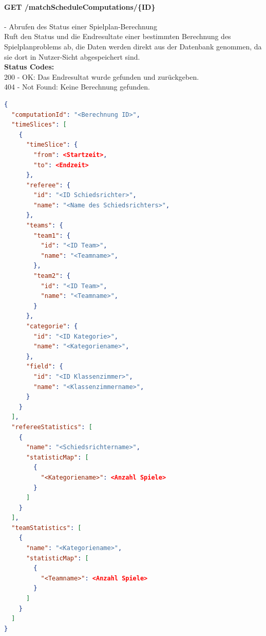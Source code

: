 \paragraph{GET /matchScheduleComputations/\{ID\}} - Abrufen des Status einer Spielplan-Berechnung\mbox{}\\
Ruft den Status und die Endresultate einer bestimmten Berechnung des Spielplanproblems ab, die Daten werden direkt aus der Datenbank genommen, da sie dort in Nutzer-Sicht abgespeichert sind.\\
\textbf{Status Codes:}\\
200 - OK: Das Endresultat wurde gefunden und zurückgeben.\\
404 - Not Found: Keine Berechnung gefunden.\\

\begin{lstlisting}[language=JSON, caption=Beispiel eines Endresultates für das Spielplanproblem, label=lst:solution_matchScheduling]  
{
  "computationId": "<Berechnung ID>",
  "timeSlices": [
    {
      "timeSlice": {
        "from": <Startzeit>,
        "to": <Endzeit>
      },
      "referee": {
        "id": "<ID Schiedsrichter>",
        "name": "<Name des Schiedsrichters>",
      },
      "teams": {
        "team1": {
          "id": "<ID Team>",
          "name": "<Teamname>",
        },
        "team2": {
          "id": "<ID Team>",
          "name": "<Teamname>",
        }
      },
      "categorie": {
        "id": "<ID Kategorie>",
        "name": "<Kategoriename>",
      },
      "field": {
        "id": "<ID Klassenzimmer>",
        "name": "<Klassenzimmername>",
      }
    }
  ],
  "refereeStatistics": [
    {
      "name": "<Schiedsrichtername>",
      "statisticMap": [
        {
          "<Kategoriename>": <Anzahl Spiele>
        }
      ]
    }
  ],
  "teamStatistics": [
    {
      "name": "<Kategoriename>",
      "statisticMap": [
        {
          "<Teamname>": <Anzahl Spiele>
        }
      ]
    }
  ]
}
\end{lstlisting}